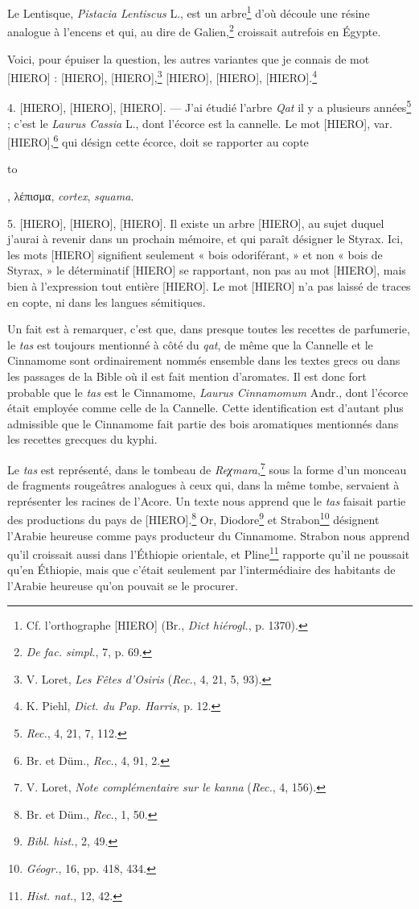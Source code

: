 \documentclass[a4paper, 11pt, oneside]{article}
\begin{document}
Le Lentisque, \emph{Pistacia Lentiscus} L., est un arbre\footnote{Cf. l'orthographe [HIERO] (Br., \emph{Dict hiérogl.}, p. 1370).} d'où découle une résine analogue à l'encens et qui, au dire de Galien,\footnote{\emph{De fac. simpl.}, 7, p. 69.} croissait autrefois en Égypte.

Voici, pour épuiser la question, les autres variantes que je connais de mot [HIERO] : [HIERO], [HIERO],\footnote{V. Loret, \emph{Les Fêtes d'Osiris} (\emph{Rec.}, 4, 21, 5, 93).} [HIERO], [HIERO], [HIERO].\footnote{K. Piehl, \emph{Dict. du Pap. Harris}, p. 12.}

4. [HIERO], [HIERO], [HIERO]. --- J'ai étudié l'arbre \emph{Qat} il y a plusieurs années\footnote{\emph{Rec.}, 4, 21, 7, 112.} ; c'est le \emph{Laurus Cassia} L., dont l'écorce est la cannelle. Le mot [HIERO], var. [HIERO],\footnote{Br. et Düm., \emph{Rec.}, 4, 91, 2.} qui désign cette écorce, doit se rapporter au copte \begin{coptic}to\end{coptic}, λέπισμα, \emph{cortex}, \emph{squama}.

5. [HIERO], [HIERO], [HIERO]. Il existe un arbre [HIERO], au sujet duquel j'aurai à revenir dans un prochain mémoire, et qui paraît désigner le Styrax. Ici, les mots [HIERO] signifient seulement « bois odoriférant, » et non « bois de Styrax, » le déterminatif [HIERO] se rapportant, non pas au mot [HIERO], mais bien à l'expression tout entière [HIERO]. Le mot [HIERO] n'a pas laissé de traces en copte, ni dans les langues sémitiques.

Un fait est à remarquer, c'est que, dans presque toutes les recettes de parfumerie, le \emph{tas} est toujours mentionné à côté du \emph{qat}, de même que la Cannelle et le Cinnamome sont ordinairement nommés ensemble dans les textes grecs ou dans les passages de la Bible où il est fait mention d'aromates. Il est donc fort probable que le \emph{tas} est le Cinnamome, \emph{Laurus Cinnamomum} Andr., dont l'écorce était employée comme celle de la Cannelle. Cette identification est d'autant plus admissible que le Cinnamome fait partie des bois aromatiques mentionnés dans les recettes grecques du kyphi.

Le \emph{tas} est représenté, dans le tombeau de \emph{Reχmara},\footnote{V. Loret, \emph{Note complémentaire sur le kanna} (\emph{Rec.}, 4, 156).} sous la forme d'un monceau de fragments rougeâtres analogues à ceux qui, dans la même tombe, servaient à représenter les racines de l'Acore. Un texte nous apprend que le \emph{tas} faisait partie des productions du pays de [HIERO].\footnote{Br. et Düm., \emph{Rec.}, 1, 50.} Or, Diodore\footnote{\emph{Bibl. hist.}, 2, 49.} et Strabon\footnote{\emph{Géogr.}, 16, pp. 418, 434.} désignent l'Arabie heureuse comme pays producteur du Cinnamome. Strabon nous apprend qu'il croissait aussi dans l'Éthiopie orientale, et Pline\footnote{\emph{Hist. nat.}, 12, 42.} rapporte qu'il ne poussait qu'en Éthiopie, mais que c'était seulement par l'intermédiaire des habitants de l'Arabie heureuse qu'on pouvait se le procurer.
\end{document}
